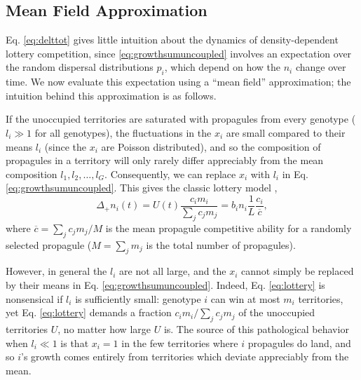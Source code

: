 \documentclass[11pt]{article}
\begin{document}
\subsection*{Mean Field Approximation}

Eq. \eqref{eq:delttot} gives little intuition about the dynamics of density-dependent lottery competition, since \eqref{eq:growthsumuncoupled} involves an expectation over the random dispersal distributions $p_i$, which depend on how the $n_i$ change over time. We now evaluate this expectation using a ``mean field'' approximation; the intuition behind this approximation is as follows.

If the unoccupied territories are saturated with propagules from every genotype ($l_i\gg 1$ for all genotypes), the fluctuations in the $x_i$ are small compared to their means $l_i$ (since the $x_i$ are Poisson distributed), and so the composition of propagules in a territory will only rarely differ appreciably from the mean composition $l_1,l_2,\ldots,l_G$. Consequently, we can replace $x_i$ with $l_i$ in Eq. \eqref{eq:growthsumuncoupled}. This gives the classic lottery model \citep{chesson_1981},
\begin{equation}
\Delta_+ n_i(t)=U(t)\frac{c_i m_i}{\sum_j c_j m_j}= b_i n_i\frac{1}{L}\frac{c_i}{\overline{c}}, \label{eq:lottery}
\end{equation}
where $\overline{c}=\sum_j c_j m_j/M$ is the mean propagule competitive ability for a randomly selected propagule ($M=\sum_j m_j$ is the total number of propagules). 

However, in general the $l_i$ are not all large, and the $x_i$ cannot simply be replaced by their means in Eq. \eqref{eq:growthsumuncoupled}. Indeed, Eq. \eqref{eq:lottery} is nonsensical if $l_i$ is sufficiently small: genotype $i$ can win at most $m_i$ territories, yet Eq. \eqref{eq:lottery} demands a fraction $c_i m_i/\sum_j c_j m_j$ of the unoccupied territories $U$, no matter how large $U$ is. The source of this pathological behavior when $l_i\ll 1$ is that $x_i=1$ in the few territories where $i$ propagules do land, and so $i$'s growth comes entirely from territories which deviate appreciably from the mean.  
\end{document}
